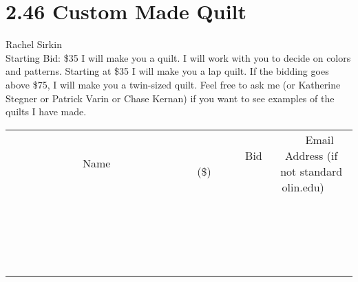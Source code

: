 \documentclass[11pt]{article}
\begin{document}
\section*{2.46 Custom Made Quilt}
Rachel Sirkin
\\
Starting Bid: \$35
\newline
I will make you a quilt. I will work with you to decide on colors and patterns. Starting at \$35 I will make you a lap quilt. If the bidding goes above \$75, I will make you a twin-sized quilt. Feel free to ask me (or Katherine Stegner or Patrick Varin or Chase Kernan) if you want to see examples of the quilts I have made.
\\[3ex]
\begin{tabular}{c c c}
~~~~~~~~~~~~~Name~~~~~~~~~~~~~ & ~~~~~~~~~Bid (\$)~~~~~~~~~  & ~~~Email Address (if not standard olin.edu)~~~\\
 & & \\
\hline
 & & \\
\hline
 & & \\
\hline
 & & \\
\hline
 & & \\
\hline
 & & \\
\hline
 & & \\
\hline
 & & \\
\hline
 & & \\
\hline
 & & \\
\hline
 & & \\
\hline
 & & \\
\hline
 & & \\
\hline
 & & \\
\hline
 & & \\
\hline
 & & \\
\hline
 & & \\
\hline
 & & \\
\hline
 & & \\
\hline
\end{tabular}
\newpage
\end{document}
